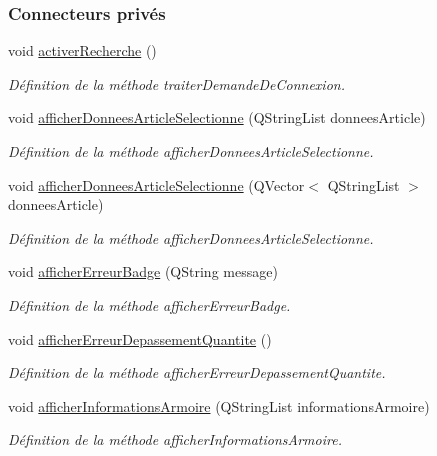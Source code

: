 \subsubsection*{Connecteurs privés}
\begin{DoxyCompactItemize}
\item 
void \hyperlink{class_ihm_a3ef457d0b75d54ab131d97f7461daab6}{activer\+Recherche} ()
\begin{DoxyCompactList}\small\item\em Définition de la méthode traiter\+Demande\+De\+Connexion. \end{DoxyCompactList}\item 
void \hyperlink{class_ihm_aca73421fd372dc490c12f77e3bbdf00c}{afficher\+Donnees\+Article\+Selectionne} (Q\+String\+List donnees\+Article)
\begin{DoxyCompactList}\small\item\em Définition de la méthode afficher\+Donnees\+Article\+Selectionne. \end{DoxyCompactList}\item 
void \hyperlink{class_ihm_af3569c42ee3f9cd38580d01a07212e44}{afficher\+Donnees\+Article\+Selectionne} (Q\+Vector$<$ Q\+String\+List $>$ donnees\+Article)
\begin{DoxyCompactList}\small\item\em Définition de la méthode afficher\+Donnees\+Article\+Selectionne. \end{DoxyCompactList}\item 
void \hyperlink{class_ihm_afbfa4f7fcca1b18186a24f1204ae8bbb}{afficher\+Erreur\+Badge} (Q\+String message)
\begin{DoxyCompactList}\small\item\em Définition de la méthode afficher\+Erreur\+Badge. \end{DoxyCompactList}\item 
void \hyperlink{class_ihm_ab6c01e8cc623695d7489be63a4309af7}{afficher\+Erreur\+Depassement\+Quantite} ()
\begin{DoxyCompactList}\small\item\em Définition de la méthode afficher\+Erreur\+Depassement\+Quantite. \end{DoxyCompactList}\item 
void \hyperlink{class_ihm_a9baabf33ec07777144921013c354884e}{afficher\+Informations\+Armoire} (Q\+String\+List informations\+Armoire)
\begin{DoxyCompactList}\small\item\em Définition de la méthode afficher\+Informations\+Armoire. \end{DoxyCompactList}\item 

\end{DoxyCompactItemize}
